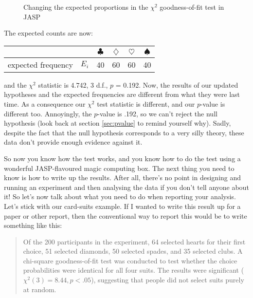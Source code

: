 \begin{figure}[htb]
\begin{center}
\caption{Changing the expected proportions in the \texorpdfstring{$\chi^2$}{} goodness-of-fit test in JASP}
\label{fig:chisquare.analysis2}
\HR
\end{center}
\end{figure}

\noindent
The expected counts are now: 
\begin{center}
\begin{tabular}{rc|cccc}
& & $\clubsuit$ & $\diamondsuit$ & $\heartsuit$ & $\spadesuit$ \\ \hline 
expected frequency &$E_i$ & 40 & 60 & 60 & 40 \\ 
\end{tabular}
\end{center}
and the $\chi^2$ statistic is 4.742, 3 d.f., $p$ = 0.192. Now, the results of our updated hypotheses and the expected frequencies are different from what they were last time. As a consequence our $\chi^2$ test statistic is different, and our $p$-value is different too. Annoyingly, the $p$-value is .192, so we can't reject the null hypothesis (look back at section \ref{sec:pvalue} to remind yourself why). Sadly, despite the fact that the null hypothesis corresponds to a very silly theory, these data don't provide enough evidence against it.


So now you know how the test works, and you know how to do the test using a wonderful JASP-flavoured magic computing box. The next thing you need to know is how to write up the results. After all, there's no point in designing and running an experiment and then analysing the data if you don't tell anyone about it! So let's now talk about what you need to do when reporting your analysis. Let's stick with our card-suits example. If I wanted to write this result up for a paper or other report, then the conventional way to report this would be to write something like this:

\begin{quote}
Of the 200 participants in the experiment, 64 selected hearts for their first choice, 51 selected diamonds, 50 selected spades, and 35 selected clubs. A chi-square goodness-of-fit test was conducted to test whether the choice probabilities were identical for all four suits. The results were significant ($\chi^2(3) = 8.44, p<.05$), suggesting that people did not select suits purely at random.
\end{quote}

